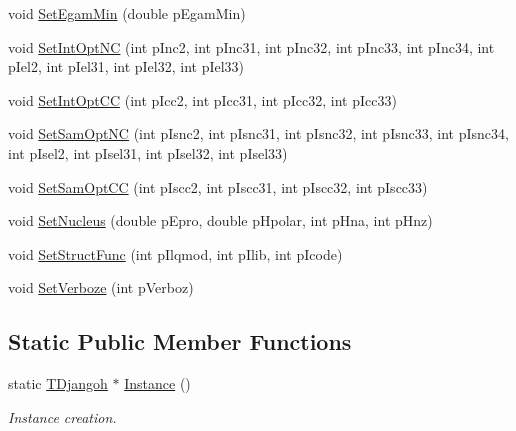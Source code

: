 \begin{DoxyCompactItemize}
void \hyperlink{class_t_djangoh_afaea9aa0144bded9b0fa1fb85b4cbb36}{Set\+Egam\+Min} (double p\+Egam\+Min)
\item 
void \hyperlink{class_t_djangoh_a0dbc06c203a2e4b29cf6fea815ee99b3}{Set\+Int\+Opt\+NC} (int p\+Inc2, int p\+Inc31, int p\+Inc32, int p\+Inc33, int p\+Inc34, int p\+Iel2, int p\+Iel31, int p\+Iel32, int p\+Iel33)
\item 
void \hyperlink{class_t_djangoh_adbec2d27a74ade279346a72d50b7e52a}{Set\+Int\+Opt\+CC} (int p\+Icc2, int p\+Icc31, int p\+Icc32, int p\+Icc33)
\item 
void \hyperlink{class_t_djangoh_a5dd265d2eb4660fb72c8f8fb477b57b1}{Set\+Sam\+Opt\+NC} (int p\+Isnc2, int p\+Isnc31, int p\+Isnc32, int p\+Isnc33, int p\+Isnc34, int p\+Isel2, int p\+Isel31, int p\+Isel32, int p\+Isel33)
\item 
void \hyperlink{class_t_djangoh_a6fca9ddb25324ad4697c1e29e8789f0c}{Set\+Sam\+Opt\+CC} (int p\+Iscc2, int p\+Iscc31, int p\+Iscc32, int p\+Iscc33)
\item 
void \hyperlink{class_t_djangoh_ad619dbb20d8cdc822f664e434ecad0aa}{Set\+Nucleus} (double p\+Epro, double p\+Hpolar, int p\+Hna, int p\+Hnz)
\item 
void \hyperlink{class_t_djangoh_a163b31acdd2a9b30095cb72840c3404b}{Set\+Struct\+Func} (int p\+Ilqmod, int p\+Ilib, int p\+Icode)
\item 
void \hyperlink{class_t_djangoh_aef7574d33f10d8ac0f0e2cd88a02cf29}{Set\+Verboze} (int p\+Verboz)
\end{DoxyCompactItemize}
\subsection*{Static Public Member Functions}
\begin{DoxyCompactItemize}
\item 
static \hyperlink{class_t_djangoh}{T\+Djangoh} $\ast$ \hyperlink{class_t_djangoh_a2e9871b8bec6326bb518f218dc87402c}{Instance} ()
\begin{DoxyCompactList}\small\item\em Instance creation. \end{DoxyCompactList}\end{DoxyCompactItemize}
